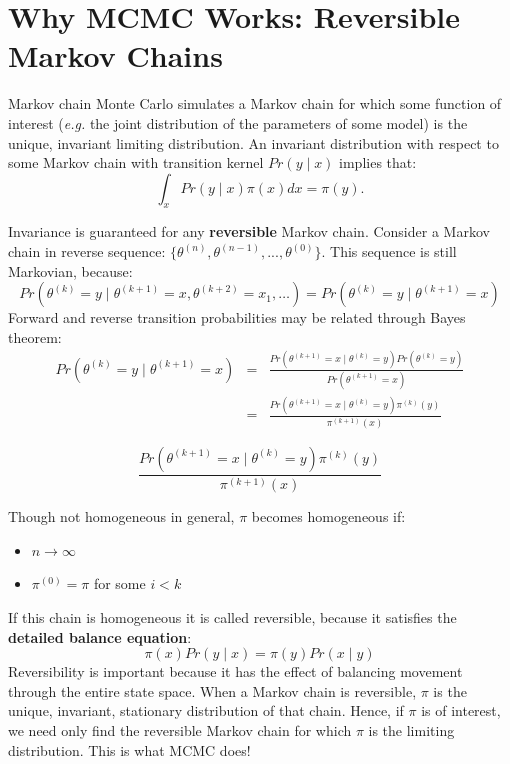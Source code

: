 
\hypertarget{reversible-markov-chains}{}
\section*{Why MCMC Works: Reversible Markov Chains}

Markov chain Monte Carlo simulates a Markov chain for which some function of interest (\emph{e.g.} the joint distribution of the parameters of some model) is the unique, invariant limiting distribution. An invariant distribution with respect to some Markov chain with transition kernel $Pr(y \mid x)$ implies that:
\[
\int_x Pr(y \mid x) \pi(x) dx = \pi(y).
\]

Invariance is guaranteed for any \textbf{reversible} Markov chain. Consider a Markov chain in reverse sequence: $\{\theta^{(n)},\theta^{(n-1)},...,\theta^{(0)}\}$. This sequence is still Markovian, because:
\[
Pr(\theta^{(k)}=y \mid \theta^{(k+1)}=x,\theta^{(k+2)}=x_1,\ldots ) = Pr(\theta^{(k)}=y \mid \theta^{(k+1)}=x)
\]
Forward and reverse transition probabilities may be related through Bayes theorem:
\begin{eqnarray}
Pr(\theta^{(k)}=y \mid \theta^{(k+1)}=x) &=& \frac{Pr(\theta^{(k+1)}=x \mid \theta^{(k)}=y) Pr(\theta^{(k)}=y)}{Pr(\theta^{(k+1)}=x)} \nonumber \\
&=& \frac{Pr(\theta^{(k+1)}=x \mid \theta^{(k)}=y) \pi^{(k)}(y)}{\pi^{(k+1)}(x)} \nonumber
\end{eqnarray}

\[
\frac{Pr(\theta^{(k+1)}=x \mid \theta^{(k)}=y) \pi^{(k)}(y)}{\pi^{(k+1)}(x)}
\]

\noindent Though not homogeneous in general, $\pi$ becomes homogeneous if:
\begin{itemize}
\item $n \rightarrow \infty$
\item $\pi^{(0)}=\pi$ for some $i < k$
\end{itemize}

\noindent If this chain is homogeneous it is called reversible, because it satisfies the \textbf{detailed balance equation}:
\[
\pi(x)Pr(y \mid x) = \pi(y) Pr(x \mid y)
\]
Reversibility is important because it has the effect of balancing movement through the entire state space. When a Markov chain is reversible, $\pi$ is the unique, invariant, stationary distribution of that chain.
Hence, if $\pi$ is of interest, we need only find the reversible Markov chain for which $\pi$ is the limiting distribution. This is what MCMC does!

